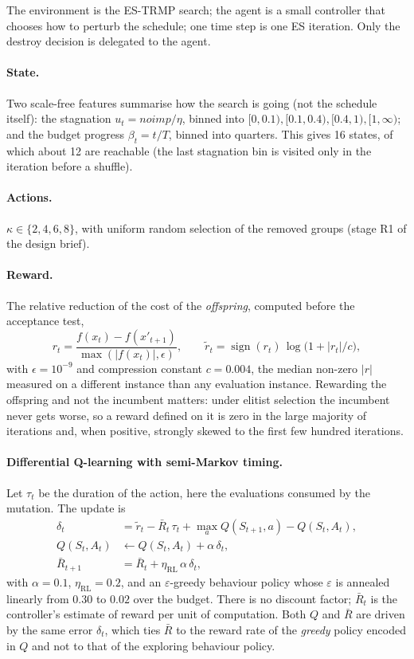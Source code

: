 The environment is the ES-TRMP search; the agent is a small controller that chooses how to perturb the schedule; one time step is one ES iteration. Only the destroy decision is delegated to the agent.

\paragraph{State.} Two scale-free features summarise how the search is going (not the schedule itself): the stagnation $u_t=noimp/\eta$, binned into $[0,0.1),[0.1,0.4),[0.4,1),[1,\infty)$; and the budget progress $\beta_t=t/T$, binned into quarters. This gives 16 states, of which about 12 are reachable (the last stagnation bin is visited only in the iteration before a shuffle).

\paragraph{Actions.} $\kappa\in\{2,4,6,8\}$, with uniform random selection of the removed groups (stage R1 of the design brief).

\paragraph{Reward.} The relative reduction of the cost of the \emph{offspring}, computed before the acceptance test,
\begin{equation}
r_t=\frac{f(x_t)-f(x'_{t+1})}{\max(|f(x_t)|,\epsilon)},\qquad \tilde r_t=\operatorname{sign}(r_t)\,\log\bigl(1+|r_t|/c\bigr),
\end{equation}
with $\epsilon=10^{-9}$ and compression constant $c=0.004$, the median non-zero $|r|$ measured on a different instance than any evaluation instance. Rewarding the offspring and not the incumbent matters: under elitist selection the incumbent never gets worse, so a reward defined on it is zero in the large majority of iterations and, when positive, strongly skewed to the first few hundred iterations.

\paragraph{Differential Q-learning with semi-Markov timing.} Let $\tau_t$ be the duration of the action, here the evaluations consumed by the mutation. The update is
\begin{align}
\delta_t &= \tilde r_t-\bar R_t\,\tau_t+\max_a Q(S_{t+1},a)-Q(S_t,A_t),\label{eq:delta}\\
Q(S_t,A_t)&\leftarrow Q(S_t,A_t)+\alpha\,\delta_t,\label{eq:qupdate}\\
\bar R_{t+1}&=\bar R_t+\eta_{\mathrm{RL}}\,\alpha\,\delta_t,\label{eq:rbar}
\end{align}
with $\alpha=0.1$, $\eta_{\mathrm{RL}}=0.2$, and an $\varepsilon$-greedy behaviour policy whose $\varepsilon$ is annealed linearly from $0.30$ to $0.02$ over the budget. There is no discount factor; $\bar R_t$ is the controller's estimate of reward per unit of computation. Both $Q$ and $\bar R$ are driven by the same error $\delta_t$, which ties $\bar R$ to the reward rate of the \emph{greedy} policy encoded in $Q$ and not to that of the exploring behaviour policy.

